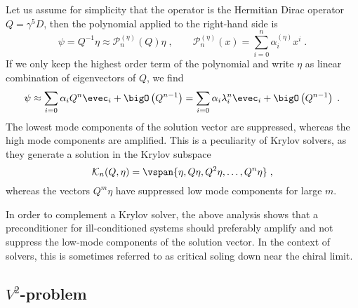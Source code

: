 Let us assume for simplicity that the operator is the Hermitian Dirac operator $Q = \gamma^{5}D$, then the polynomial applied to the right-hand side is
\begin{equation}
\psi = Q^{-1} \eta \approx \mathcal{P}_{n}^{(\eta)}(Q) \eta \;,
\qquad
\mathcal{P}_{n}^{(\eta)}(x) = \sum_{i=0}^{n} \alpha_{i}^{(\eta)} x^i \;.
\end{equation}
If we only keep the highest order term of the polynomial and write $\eta$ as linear combination of eigenvectors of $Q$, we find
\begin{eqnarray}
\psi
\approx \sum_{i=0} \alpha_i Q^{n} \evec_i + \bigO\left(Q^{n-1}\right)
= \sum_{i=0} \alpha_i \lambda_i^{n} \evec_i + \bigO\left(Q^{n-1}\right) \;.
\end{eqnarray}
The lowest mode components of the solution vector are suppressed, whereas the high mode components are amplified.
This is a peculiarity of Krylov solvers, as they generate a solution in the Krylov subspace~\cite{wright2006numerical,simoncini2003theory}
\begin{equation}
\mathcal{K}_n(Q, \eta) = \vspan{ \eta, Q \eta, Q^{2} \eta, \ldots, Q^{n} \eta } \;,
\end{equation}
whereas the vectors $Q^{m} \eta$ have suppressed low mode components for large $m$.


In order to complement a Krylov solver, the above analysis shows that a preconditioner for ill-conditioned systems should preferably amplify and not suppress the low-mode components of the solution vector.
In the context of solvers, this is sometimes referred to as critical soling down near the chiral limit.

\subsection{\texorpdfstring{$V^{2}$}{V2}-problem}
\label{sec:mg:V2:problem}

